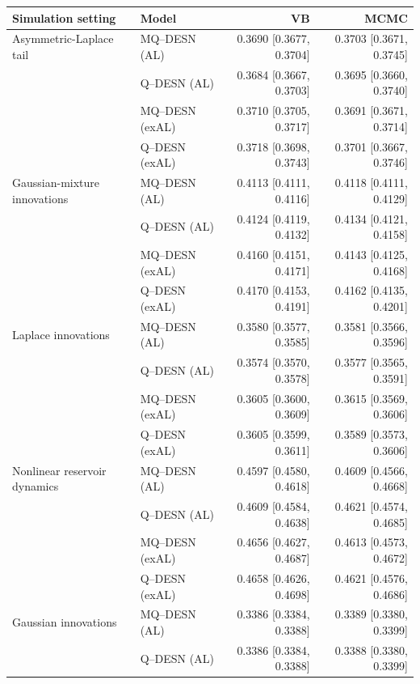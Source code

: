 \begin{table}[!htbp]
\centering
\footnotesize
\setlength{\tabcolsep}{3pt}
\renewcommand{\arraystretch}{1.08}
\begin{tabular}{@{}>{\raggedright\arraybackslash}p{}lrr@{}}
\toprule
Simulation setting & Model & VB & MCMC \\
\midrule
Asymmetric-Laplace tail & MQ--DESN (AL) & 0.3690 [0.3677, 0.3704] & 0.3703 [0.3671, 0.3745] \\
 & Q--DESN (AL) & 0.3684 [0.3667, 0.3703] & 0.3695 [0.3660, 0.3740] \\
 & MQ--DESN (exAL) & 0.3710 [0.3705, 0.3717] & 0.3691 [0.3671, 0.3714] \\
 & Q--DESN (exAL) & 0.3718 [0.3698, 0.3743] & 0.3701 [0.3667, 0.3746] \\
\addlinespace[2pt]
Gaussian-mixture innovations & MQ--DESN (AL) & 0.4113 [0.4111, 0.4116] & 0.4118 [0.4111, 0.4129] \\
 & Q--DESN (AL) & 0.4124 [0.4119, 0.4132] & 0.4134 [0.4121, 0.4158] \\
 & MQ--DESN (exAL) & 0.4160 [0.4151, 0.4171] & 0.4143 [0.4125, 0.4168] \\
 & Q--DESN (exAL) & 0.4170 [0.4153, 0.4191] & 0.4162 [0.4135, 0.4201] \\
\addlinespace[2pt]
Laplace innovations & MQ--DESN (AL) & 0.3580 [0.3577, 0.3585] & 0.3581 [0.3566, 0.3596] \\
 & Q--DESN (AL) & 0.3574 [0.3570, 0.3578] & 0.3577 [0.3565, 0.3591] \\
 & MQ--DESN (exAL) & 0.3605 [0.3600, 0.3609] & 0.3615 [0.3569, 0.3606] \\
 & Q--DESN (exAL) & 0.3605 [0.3599, 0.3611] & 0.3589 [0.3573, 0.3606] \\
\addlinespace[2pt]
Nonlinear reservoir dynamics & MQ--DESN (AL) & 0.4597 [0.4580, 0.4618] & 0.4609 [0.4566, 0.4668] \\
 & Q--DESN (AL) & 0.4609 [0.4584, 0.4638] & 0.4621 [0.4574, 0.4685] \\
 & MQ--DESN (exAL) & 0.4656 [0.4627, 0.4687] & 0.4613 [0.4573, 0.4672] \\
 & Q--DESN (exAL) & 0.4658 [0.4626, 0.4698] & 0.4621 [0.4576, 0.4686] \\
\addlinespace[2pt]
Gaussian innovations & MQ--DESN (AL) & 0.3386 [0.3384, 0.3388] & 0.3389 [0.3380, 0.3399] \\
 & Q--DESN (AL) & 0.3386 [0.3384, 0.3388] & 0.3388 [0.3380, 0.3399] \\

\end{tabular}
\end{table}
